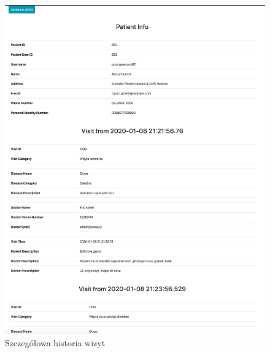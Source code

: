 \begin{figure}[H]
\centering
\includegraphics[width=15cm]{pictures/service/09-history_normal}
\caption{Szczegółowa historia wizyt}
\end{figure}

